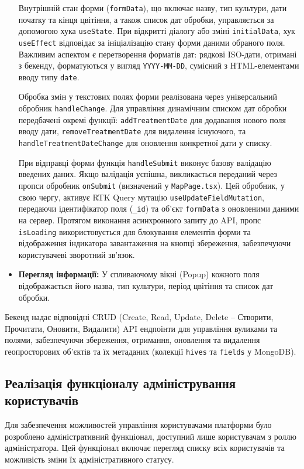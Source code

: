 \begin{itemize}
    Внутрішній стан форми (\texttt{formData}), що включає назву, тип культури, дати початку та кінця цвітіння, а також список дат обробки, управляється за допомогою хука \texttt{useState}. При відкритті діалогу або зміні \texttt{initialData}, хук \texttt{useEffect} відповідає за ініціалізацію стану форми даними обраного поля. Важливим аспектом є перетворення форматів дат: рядкові ISO-дати, отримані з бекенду, форматуються у вигляд \texttt{YYYY-MM-DD}, сумісний з HTML-елементами вводу типу \texttt{date}.
    
    Обробка змін у текстових полях форми реалізована через універсальний обробник \texttt{handleChange}. Для управління динамічним списком дат обробки передбачені окремі функції: \texttt{addTreatmentDate} для додавання нового поля вводу дати, \texttt{removeTreatmentDate} для видалення існуючого, та \texttt{handleTreatmentDateChange} для оновлення конкретної дати у списку. 
    
    При відправці форми функція \texttt{handleSubmit} виконує базову валідацію введених даних. Якщо валідація успішна, викликається переданий через пропси обробник \texttt{onSubmit} (визначений у \texttt{MapPage.tsx}). Цей обробник, у свою чергу, активує RTK Query мутацію \texttt{useUpdateFieldMutation}, передаючи ідентифікатор поля (\texttt{\_id}) та об'єкт \texttt{formData} з оновленими даними на сервер. Протягом виконання асинхронного запиту до API, пропс \texttt{isLoading} використовується для блокування елементів форми та відображення індикатора завантаження на кнопці збереження, забезпечуючи користувачеві зворотний зв'язок.

    \item \textbf{Перегляд інформації:} У спливаючому вікні (Popup) кожного поля відображається його назва, тип культури, період цвітіння та список дат обробки.
\end{itemize}

Бекенд надає відповідні CRUD (Create, Read, Update, Delete – Створити, Прочитати, Оновити, Видалити) API ендпоінти для управління вуликами та полями, забезпечуючи збереження, отримання, оновлення та видалення геопросторових об'єктів та їх метаданих (колекції \texttt{hives} та \texttt{fields} у MongoDB).

\subsection{Реалізація функціоналу адміністрування користувачів}
\label{subsec:admin_user_management}
Для забезпечення можливостей управління користувачами платформи було розроблено адміністративний функціонал, доступний лише користувачам з роллю адміністратора. Цей функціонал включає перегляд списку всіх користувачів та можливість зміни їх адміністративного статусу.

